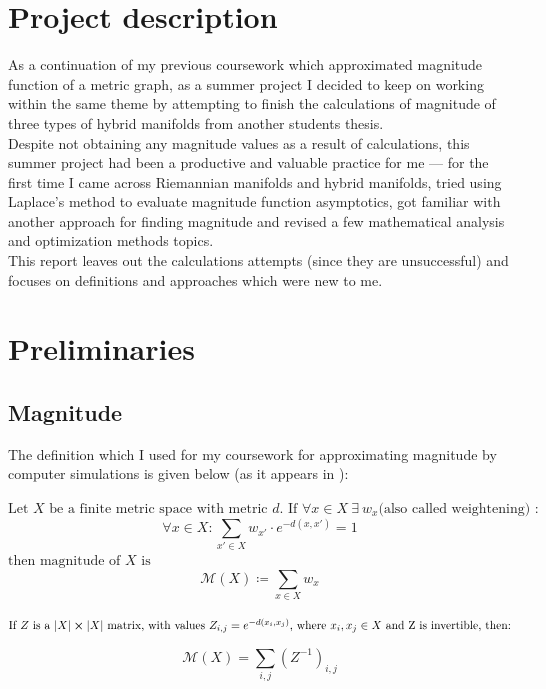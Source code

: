 \documentclass{article}
\begin{document}
\makeTitlePage

\tableofcontents

\section{Project description}

As a continuation of my previous coursework which approximated magnitude function
of a metric graph, as a summer project I decided to keep on working within the same theme by 
attempting to finish the calculations of magnitude of three types of hybrid manifolds
from another students thesis.
\\

Despite not obtaining any magnitude values as a result of calculations, this summer
project had been a productive and valuable practice for me --- for the first time
I came across Riemannian manifolds and hybrid manifolds, tried using Laplace's
method to evaluate magnitude function asymptotics, got familiar with another approach
for finding magnitude and revised a few mathematical analysis and optimization methods topics. 
\\

This report leaves out the calculations attempts (since they are unsuccessful) and
focuses on definitions and approaches which were new to me.

\section{Preliminaries}
\subsection{Magnitude}

The definition which I used for my coursework for approximating magnitude by computer simulations is given below (as it appears in \textcite{calc}):

\begin{definition}
\item
    $\text{Let $X$ be a finite metric space with metric $d$. If $\forall x \in X \  \exists \  w_x$(also called weightening) : }$ 
    $$\forall x \in X : \sum_{x' \in X} w_{x'} \cdot e^{-d(x, x')} = 1$$
    $\text{then magnitude of $X$ is }$
    $$\mathcal{M}(X) \coloneqq \sum_{x \in X} w_x $$ 
\item
\end{definition}
\begin{remark}
\item
    $\text{If $Z$ is a $|X| \cross |X|$ matrix, with values $Z_{i, j} = e^{-d(x_i, x_j)}$, where $x_i, x_j \in X$ and Z is invertible, then:}$
\item
    $$\mathcal{M}(X) = \sum_{i, j} (Z^{-1})_{i, j} $$
\end{remark}
\end{document}
